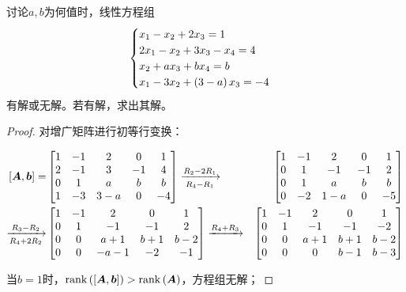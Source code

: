 \begin{problem}\label{problem-2.5}
讨论\(a,b\)为何值时，线性方程组
\begin{equation*}
    \begin{cases}
        x_1-x_2+2x_3=1            \\
        2x_1-x_2+3x_3-x_4=4       \\
        x_2+ax_3+bx_4=b           \\
        x_1-3x_2+\left( 3-a \right)x_3=-4 \\
    \end{cases}
\end{equation*}
有解或无解。若有解，求出其解。
\end{problem}
\begin{proof}
    对增广矩阵进行初等行变换：
    \begin{small}
        \begin{align*}
            \left[ \boldsymbol{A},\boldsymbol{b} \right]=
             & \begin{bmatrix}
                   1 & -1 & 2   & 0  & 1  \\
                   2 & -1 & 3   & -1 & 4  \\
                   0 & 1  & a   & b  & b  \\
                   1 & -3 & 3-a & 0  & -4
               \end{bmatrix}\xrightarrow[R_4-R_1]{R_2-2R_1}
             & \begin{bmatrix}
                   1 & -1 & 2   & 0  & 1  \\
                   0 & 1  & -1  & -1 & 2  \\
                   0 & 1  & a   & b  & b  \\
                   0 & -2 & 1-a & 0  & -5
               \end{bmatrix}                       \\
            \xrightarrow[R_4+2R_2]{R_3-R_2}
             & \begin{bmatrix}
                   1 & -1 & 2    & 0   & 1   \\
                   0 & 1  & -1   & -1  & 2   \\
                   0 & 0  & a+1  & b+1 & b-2 \\
                   0 & 0  & -a-1 & -2  & -1
               \end{bmatrix}\xrightarrow{R_4+R_3}
             & \begin{bmatrix}
                   1 & -1 & 2   & 0   & 1   \\
                   0 & 1  & -1  & -1  & -2  \\
                   0 & 0  & a+1 & b+1 & b-2 \\
                   0 & 0  & 0   & b-1 & b-3
               \end{bmatrix}
        \end{align*}
    \end{small}
    当\(b=1\)时，\(\mathrm{rank}\left( \left[ \boldsymbol{A},\boldsymbol{b} \right] \right)>\mathrm{rank}\left( \boldsymbol{A} \right)\)，方程组无解；


\end{proof}
